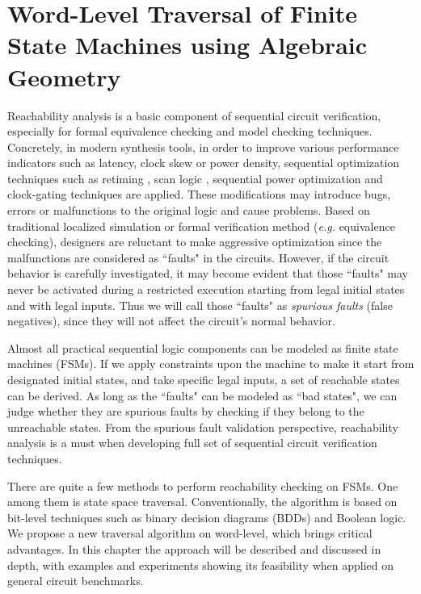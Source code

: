 \chapter{Word-Level Traversal of Finite State Machines using Algebraic Geometry}
\label{ch:reacha}
Reachability analysis is a basic component of sequential circuit verification, especially for 
formal equivalence checking and model checking techniques. Concretely, in modern synthesis 
tools, in order to improve various performance indicators such as latency, clock skew or power
density, sequential optimization techniques such as retiming \cite{retiming}, scan logic \cite{scan},
sequential power optimization \cite{mathur2009power} and clock-gating techniques \cite{clockgating} are applied.
These modifications may introduce bugs, errors or malfunctions to the original logic and cause problems. 
Based on traditional localized simulation or formal verification method ({\it e.g.} equivalence checking), 
designers are reluctant to make aggressive optimization
since the malfunctions are considered as ``faults" in the circuits.
However, if the circuit behavior is carefully investigated, it may become evident that 
those ``faults" may never be activated during a restricted execution starting 
from legal initial states and with legal inputs. Thus we will call those ``faults" as 
{\it spurious faults} (false negatives), since they will not affect the circuit's normal behavior.

Almost all practical sequential logic components can be modeled as finite state machines (FSMs). 
If we apply constraints upon the machine to make it start from designated initial states, and 
take specific legal inputs, a set of reachable states can be derived. 
As long as the ``faults" can be modeled as ``bad states", we can judge whether they are 
spurious faults by checking if they belong to the unreachable states. From the spurious fault validation 
perspective, reachability analysis is a must when developing full set of sequential circuit verification
techniques.

There are quite a few methods to perform reachability checking on FSMs. One among them is 
state space traversal. Conventionally, the algorithm is based on bit-level techniques such as
binary decision diagrams (BDDs) and Boolean logic. We propose a new traversal algorithm on word-level,
which brings critical advantages. In this chapter the approach will be described and discussed in depth, 
with examples and experiments showing its feasibility when applied on general circuit benchmarks.


